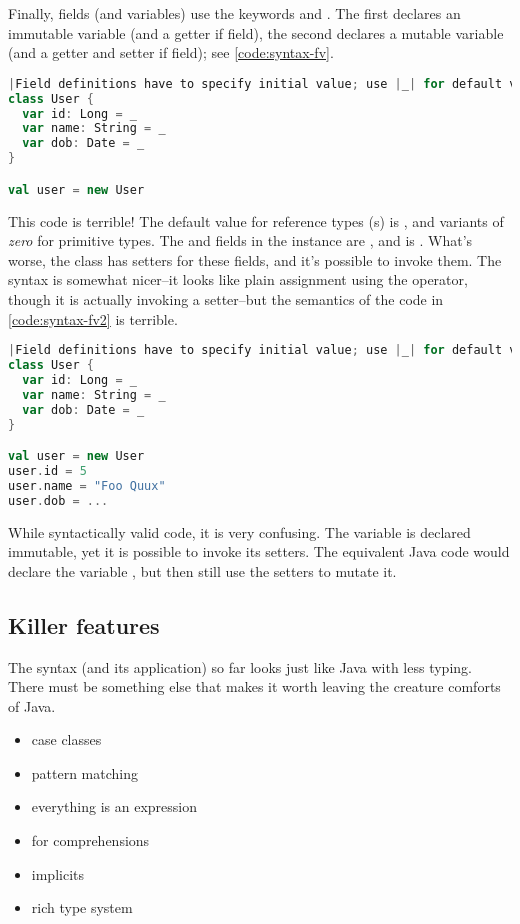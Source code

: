 \documentclass[10 pt]{article}
\begin{document}
Finally, fields (and variables) use the keywords  and . The first declares an immutable variable (and a getter if field), the second declares a mutable variable (and a getter and setter if field); see \autoref{code:syntax-fv}.

\begin{lstlisting}[caption={Fields \& variables}, label={code:syntax-fv}, language=Scala, escapechar=|]
|Field definitions have to specify initial value; use |_| for default value.|
class User {
  var id: Long = _
  var name: String = _
  var dob: Date = _
}

val user = new User
\end{lstlisting}

This code is terrible! The default value for reference types (s) is , and variants of \emph{zero} for primitive types. The  and  fields in the  instance are , and  is . What's worse, the class has setters for these fields, and it's possible to invoke them. The syntax is somewhat nicer--it looks like plain assignment using the \pcode{=} operator, though it is actually invoking a setter--but the semantics of the code in \autoref{code:syntax-fv2} is terrible.

\begin{lstlisting}[caption={Fields \& variables II}, label={code:syntax-fv2}, language=Scala, escapechar=|]
|Field definitions have to specify initial value; use |_| for default value.|
class User {
  var id: Long = _
  var name: String = _
  var dob: Date = _
}

val user = new User
user.id = 5
user.name = "Foo Quux"
user.dob = ...
\end{lstlisting}

While syntactically valid code, it is very confusing. The  variable is declared immutable, yet it is possible to invoke its setters. The equivalent Java code would declare the  variable , but then still use the setters to mutate it.

\subsection{Killer features}
The syntax (and its application) so far looks just like Java with less typing. There must be something else that makes it worth leaving the creature comforts of Java. 

\begin{itemize}
  \item case classes
  \item pattern matching
  \item everything is an expression
  \item for comprehensions
  \item implicits
  \item rich type system
\end{itemize}
\end{document}
